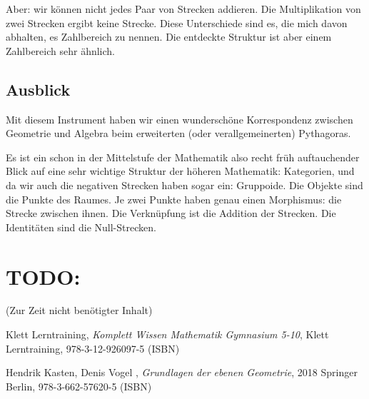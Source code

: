 \documentclass[a4paper]{amsart}
\theoremstyle{definition}
\begin{document}
Aber: wir können nicht jedes Paar von Strecken addieren. Die Multiplikation von zwei Strecken ergibt keine Strecke. Diese Unterschiede sind es, die mich davon abhalten, es Zahlbereich zu nennen. Die entdeckte Struktur ist aber einem Zahlbereich sehr ähnlich.

\subsection{Ausblick}
Mit diesem Instrument haben wir einen wunderschöne Korrespondenz zwischen Geometrie und Algebra beim erweiterten (oder verallgemeinerten) Pythagoras.

Es ist ein schon in der Mittelstufe der Mathematik also recht früh auftauchender Blick auf eine sehr wichtige Struktur der höheren Mathematik: Kategorien, und da wir auch die negativen Strecken haben sogar ein: Gruppoide. Die Objekte sind die Punkte des Raumes. Je zwei Punkte haben genau einen Morphismus: die Strecke zwischen ihnen. Die Verknüpfung ist die Addition der Strecken. Die Identitäten sind die Null-Strecken.

\section{TODO:}
\begin{backup}
    (Zur Zeit nicht benötigter Inhalt)
\end{backup}

\begin{thebibliography}{9}

      Klett Lerntraining, \emph{Komplett Wissen Mathematik Gymnasium 5-10},
      Klett Lerntraining, 978-3-12-926097-5 (ISBN)
      
       Hendrik Kasten, Denis Vogel , \emph{Grundlagen der ebenen Geometrie},
      2018 Springer Berlin, 978-3-662-57620-5 (ISBN)

\end{thebibliography}
\end{document}
